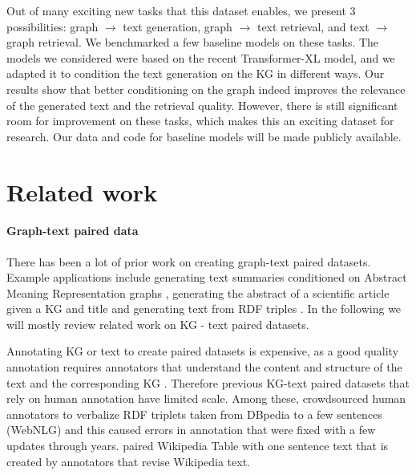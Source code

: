 \documentclass[11pt]{article}
\begin{document}
Out of many exciting new tasks that this dataset enables, we present 3 possibilities: graph $\rightarrow$ text generation, graph $\rightarrow$ text retrieval, and text $\rightarrow$ graph retrieval.  We benchmarked a few baseline models on these tasks.  The models we considered were based on the recent Transformer-XL \cite{dai2019transformer} model, and we adapted it to condition the text generation on the KG in different ways.  Our results show that better conditioning on the graph indeed improves the relevance of the generated text and the retrieval quality.  However, there is still significant room for improvement on these tasks, which makes this an exciting dataset for research.
Our data and code for baseline models will be made publicly available. 
 








\section{Related work}

\paragraph{Graph-text paired data} There has been a lot of prior work on creating graph-text paired datasets.
Example applications include generating text summaries conditioned on Abstract Meaning Representation graphs \cite{liu2018toward}, generating the abstract of a scientific article given a KG and title \cite{koncel-kedziorski-etal-2019-text} and generating text from RDF triples \cite{gardent-etal-2017-webnlg,jin-etal-2020-genwiki}.  In the following we will mostly review related work on KG - text paired datasets.

Annotating KG or text to create paired datasets is expensive, as
a good quality annotation requires annotators that understand the content and structure of the text and the corresponding KG \cite{jin-etal-2020-genwiki}.
Therefore previous KG-text paired datasets that rely on human annotation have limited scale.
Among these, \citet{gardent-etal-2017-webnlg} crowdsourced human annotators to verbalize RDF triplets taken from DBpedia \cite{DBpedia} to a few sentences (WebNLG) and this caused errors in annotation that were fixed with a few updates through years.
\citet{parikh2020totto} paired Wikipedia Table with one sentence text that is created by annotators that revise Wikipedia text.
\end{document}
